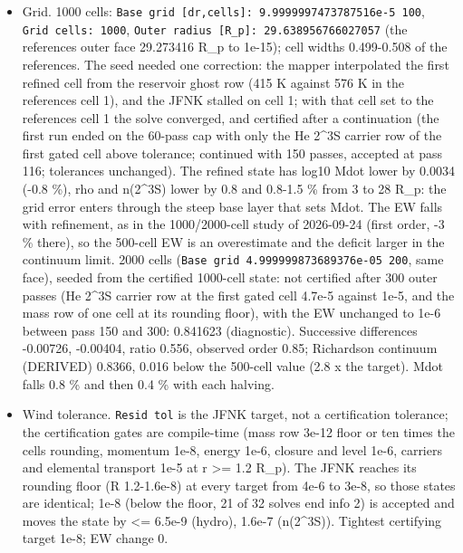 \documentclass[english,a4paper]{my_memo}
\providecommand{\tightlist}{\setlength{\itemsep}{0pt}\setlength{\parskip}{0pt}}
\begin{document}
\begin{itemize}
\tightlist
\item
  Grid. 1000 cells: \texttt{Base\ grid\ {[}dr,cells{]}:\ 9.9999997473787516e-5\ 100},
  \texttt{Grid\ cells:\ 1000}, \texttt{Outer\ radius\ {[}R\_p{]}:\ 29.638956766027057} (the
  reference\textquotesingle s outer face 29.273416 R\_p to 1e-15); cell widths 0.499-0.508 of
  the reference\textquotesingle s. The seed needed one correction: the mapper interpolated
  the first refined cell from the reservoir ghost row (415 K against 576 K in
  the reference\textquotesingle s cell 1), and the JFNK stalled on cell 1; with that cell
  set to the reference\textquotesingle s cell 1 the solve converged, and certified after a
  continuation (the first run ended on the 60-pass cap with only the He 2\^{}3S
  carrier row of the first gated cell above tolerance; continued with 150
  passes, accepted at pass 116; tolerances unchanged). The refined state has
  log10 Mdot lower by 0.0034 (-0.8 \%), rho and n(2\^{}3S) lower by 0.8 and
  0.8-1.5 \% from 3 to 28 R\_p: the grid error enters through the steep base
  layer that sets Mdot. The EW falls with refinement, as in the 1000/2000-cell
  study of 2026-09-24 (first order, -3 \% there), so the 500-cell EW is an
  overestimate and the deficit larger in the continuum limit. 2000 cells
  (\texttt{Base\ grid\ 4.999999873689376e-05\ 200}, same face), seeded from the
  certified 1000-cell state: not certified after 300 outer passes (He 2\^{}3S
  carrier row at the first gated cell 4.7e-5 against 1e-5, and the mass row
  of one cell at its rounding floor), with the EW unchanged to 1e-6 between
  pass 150 and 300: 0.841623 (diagnostic). Successive differences -0.00726,
  -0.00404, ratio 0.556, observed order 0.85; Richardson continuum (DERIVED)
  0.8366, 0.016 below the 500-cell value (2.8 x the target). Mdot falls
  0.8 \% and then 0.4 \% with each halving.
\item
  Wind tolerance. \texttt{Resid\ tol} is the JFNK target, not a certification
  tolerance; the certification gates are compile-time (mass row 3e-12 floor
  or ten times the cell\textquotesingle s rounding, momentum 1e-8, energy 1e-6, closure and
  level 1e-6, carriers and elemental transport 1e-5 at r \textgreater= 1.2 R\_p). The
  JFNK reaches its rounding floor (\textbar\textbar R\textbar\textbar{} 1.2-1.6e-8) at every target from
  4e-6 to 3e-8, so those states are identical; 1e-8 (below the floor, 21 of
  32 solves end info 2) is accepted and moves the state by \textless= 6.5e-9 (hydro),
  1.6e-7 (n(2\^{}3S)). Tightest certifying target 1e-8; EW change 0.

\end{itemize}
\end{document}
